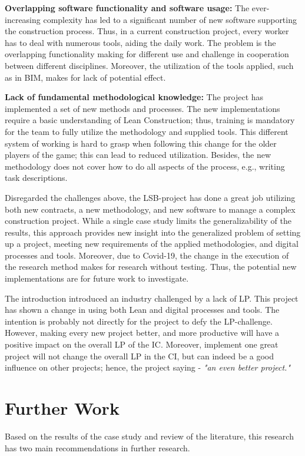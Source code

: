 {\bf Overlapping software functionality and software usage:} The ever-increasing complexity has led to a significant number of new software supporting the construction process. Thus, in a current construction project, every worker has to deal with numerous tools, aiding the daily work. The problem is the overlapping functionality making for different use and challenge in cooperation between different disciplines. Moreover, the utilization of the tools applied, such as in BIM, makes for lack of potential effect.  
    
{\bf Lack of fundamental methodological knowledge:} The project has implemented a set of new methods and processes. The new implementations require a basic understanding of Lean Construction; thus, training is mandatory for the team to fully utilize the methodology and supplied tools. This different system of working is hard to grasp when following this change for the older players of the game; this can lead to reduced utilization. Besides, the new methodology does not cover how to do all aspects of the process, e.g., writing task descriptions.

Disregarded the challenges above, the LSB-project has done a great job utilizing both new contracts, a new methodology, and new software to manage a complex construction project. While a single case study limits the generalizability of the results, this approach provides new insight into the generalized problem of setting up a project, meeting new requirements of the applied methodologies, and digital processes and tools. Moreover, due to Covid-19, the change in the execution of the research method makes for research without testing. Thus, the potential new implementations are for future work to investigate. 

The introduction introduced an industry challenged by a lack of LP. This project has shown a change in using both Lean and digital processes and tools. The intention is probably not directly for the project to defy the LP-challenge. However, making every new project better, and more productive will have a positive impact on the overall LP of the IC. Moreover, implement one great project will not change the overall LP in the CI, but can indeed be a good influence on other projects; hence, the project saying - \textit{"an even better project."}

\section{Further Work} \label{sec:further_research}
Based on the results of the case study and review of the literature, this research has two main recommendations in further research.

